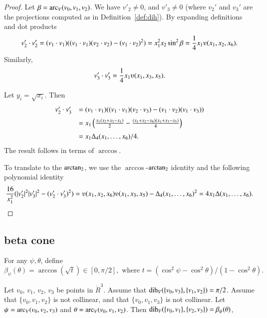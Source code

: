 \begin{proof}
Let $\beta = \operatorname{arc}_V(v_0,v_1,v_2)$.
We have $v'_2\ne 0$, and $v'_3 \ne 0$ (where $v_2'$ and
$v_3'$ are the projections computed as in Definition~\ref{def:dih}).  
    By expanding definitions and dot products
    $$
    v'_2\cdot v'_2 = (v_1\cdot v_1) ((v_1\cdot v_1)(v_2\cdot v_2) -
    (v_1\cdot v_2)^2) =  x_1^2 x_2 \sin^2 \beta = \frac{1}{4}
    x_1
    \ups(x_1,x_2,x_6).
    $$
    Similarly,
    $$v'_3 \cdot v'_3 = \frac{1}{4} x_1 \ups(x_1,x_3,x_5).$$

Let $y_i = \sqrt{x_i}$. Then
    $$\begin{array}{lll}
    v'_2\cdot v'_3 &= (v_1\cdot v_1)((v_1\cdot v_1)(v_2\cdot v_3) -
    (v_1\cdot v_2)(v_1\cdot v_3) ) \vspace{6pt} \\  &
    = x_1 \left(\frac{ x_1 (x_2 + x_3 -
    x_1)}{2} - \frac{(x_1 + x_2 - x_6)(x_1 + x_3 -
    x_5)}{4} \right)\vspace{6pt}\\&
    = {x_1\Delta_4(x_1,\ldots,x_6)}/{4}.
    \end{array}
    $$
The result follows in terms of $\arccos$.

To translate to the ${\operatorname{arctan_2}}$, 
we use the $\arccos$-${\operatorname{arctan_2}}$ identity
and the following polynomial identity
    $$
    \frac{16}{x_1^2}(|v'_2|^2 |v'_3|^2 - (v'_2\cdot v'_3)^2) =
    \ups(x_1,x_2,x_6)\ups(x_1,x_3,x_5) - \Delta_4(x_1,\ldots,x_6)^2
    = 4 x_1 \Delta(x_1,\ldots,x_6).
    $$
\end{proof}


\subsection{beta cone}

\begin{definition}[beta]  For any $\psi,\theta$, define
   $$
   \beta_\psi(\theta) = \arccos(\sqrt{t}) \in[0,\pi/2],\text{ where }
   t = (\cos^2\psi-\cos^2\theta)/(1-\cos^2\theta).
   $$
\end{definition}

\begin{lemma}\label{lemma:beta-cone}
Let $v_0$, $v_1$, $v_2$, $v_3$ be points in $\ring{R}^3$.   
Assume
that $\operatorname{dih}_V(\{v_0,v_3\},\{v_1,v_2\})=\pi/2$. 
Assume that $\{v_0,v_1,v_2\}$ is not collinear, and that
$\{v_0,v_1,v_3\}$ is not collinear. Let
$\psi = \operatorname{arc}_V(v_0,v_2,v_3)$ and $\theta=\operatorname{arc}_V(v_0,v_1,v_2)$. 
Then $\operatorname{dih}_V(\{v_0,v_1\},\{v_2,v_3\}) = \beta_\psi(\theta)$,
\end{lemma}

